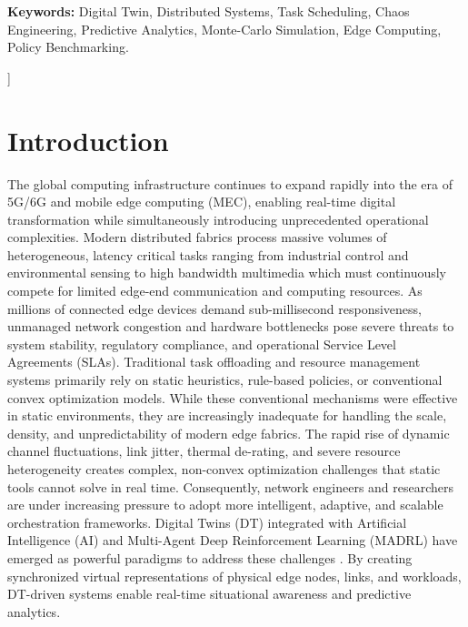\documentclass[twoside,twocolumn,10pt]{article}
\begin{document}
\begin{@twocolumnfalse}
\vspace{0.3cm}
\noindent\textbf{Keywords:}
Digital Twin, Distributed Systems, Task Scheduling, Chaos Engineering, Predictive Analytics, Monte-Carlo Simulation, Edge Computing, Policy Benchmarking.

\vspace{0.8cm}
\end{@twocolumnfalse}
]

\section{Introduction} \fontsize{11}{13}\selectfont

The global computing infrastructure continues to expand rapidly into the era of 5G/6G and mobile edge computing (MEC), enabling real-time digital transformation while simultaneously introducing unprecedented operational complexities.
Modern distributed fabrics process massive volumes of heterogeneous, latency critical tasks ranging from industrial control and environmental sensing to high bandwidth multimedia which must continuously compete for limited edge-end communication and computing resources.
As millions of connected edge devices demand sub-millisecond responsiveness, unmanaged network congestion and hardware bottlenecks pose severe threats to system stability, regulatory compliance, and operational Service Level Agreements (SLAs).
Traditional task offloading and resource management systems primarily rely on static heuristics, rule-based policies, or conventional convex optimization models.
While these conventional mechanisms were effective in static environments, they are increasingly inadequate for handling the scale, density, and unpredictability of modern edge fabrics.
The rapid rise of dynamic channel fluctuations, link jitter, thermal de-rating, and severe resource heterogeneity creates complex, non-convex optimization challenges that static tools cannot solve in real time.
Consequently, network engineers and researchers are under increasing pressure to adopt more intelligent, adaptive, and scalable orchestration frameworks.
Digital Twins (DT) integrated with Artificial Intelligence (AI) and Multi-Agent Deep Reinforcement Learning (MADRL) have emerged as powerful paradigms to address these challenges \cite{lv2022, grieves2022}.
By creating synchronized virtual representations of physical edge nodes, links, and workloads, DT-driven systems enable real-time situational awareness and predictive analytics.
\end{document}
